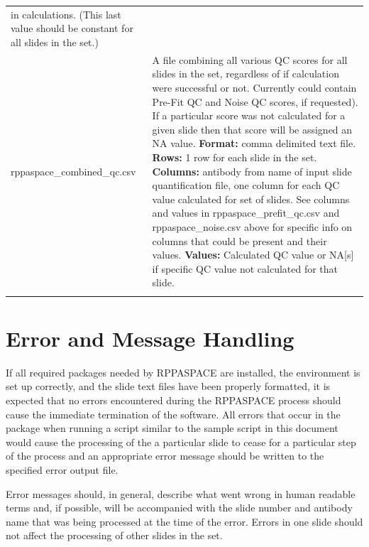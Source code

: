 \documentclass[
]{article}
\begin{document}
\begin{longtable}[]{@{}ll@{}}
\begin{minipage}[t]{0.52\columnwidth}
in calculations. (This last value should be constant for all slides in
the set.)\strut
\end{minipage}\tabularnewline
\begin{minipage}[t]{0.42\columnwidth}\raggedright
rppaspace\_combined\_qc.csv\strut
\end{minipage} & \begin{minipage}[t]{0.52\columnwidth}\raggedright
A file combining all various QC scores for all slides in the set,
regardless of if calculation were successful or not. Currently could
contain Pre-Fit QC and Noise QC scores, if requested). If a particular
score was not calculated for a given slide then that score will be
assigned an NA value. \textbf{Format:} comma delimited text file.
\textbf{Rows:} 1 row for each slide in the set. \textbf{Columns:}
antibody from name of input slide quantification file, one column for
each QC value calculated for set of slides. See columns and values in
rppaspace\_prefit\_qc.csv and rppaspace\_noise.csv above for specific
info on columns that could be present and their values. \textbf{Values:}
Calculated QC value or NA{[}s{]} if specific QC value not calculated for
that slide.\strut
\end{minipage}\tabularnewline
\begin{minipage}[t]{0.42\columnwidth}\raggedright
\strut
\end{minipage} & \begin{minipage}[t]{0.52\columnwidth}\raggedright
\strut
\end{minipage}\tabularnewline
\bottomrule
\end{longtable}

\hypertarget{errors}{%
\section{Error and Message Handling}\label{errors}}

If all required packages needed by RPPASPACE are installed, the
environment is set up correctly, and the slide text files have been
properly formatted, it is expected that no errors encountered during the
RPPASPACE process should cause the immediate termination of the
software. All errors that occur in the package when running a script
similar to the sample script in this document would cause the processing
of the a particular slide to cease for a particular step of the process
and an appropriate error message should be written to the specified
error output file.

Error messages should, in general, describe what went wrong in human
readable terms and, if possible, will be accompanied with the slide
number and antibody name that was being processed at the time of the
error. Errors in one slide should not affect the processing of other
slides in the set.
\end{document}
